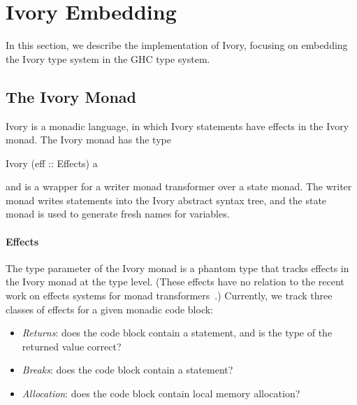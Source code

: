 \section{Ivory Embedding}
\label{sec:ivory-embedding}

In this section, we describe the implementation of Ivory, focusing on embedding
the Ivory type system in the GHC type system.

\subsection{The Ivory Monad}
\label{sec:ivory-monad}

Ivory is a monadic language, in which Ivory statements have effects in the Ivory
monad. The Ivory monad has the type

\begin{code}
Ivory (eff :: Effects) a
\end{code}

\noindent
and is a wrapper for a writer monad transformer over a state monad. The writer
monad writes statements into the Ivory abstract syntax tree, and the
state monad is used to generate fresh names for variables.

\paragraph{Effects}
The  type parameter of the Ivory monad is a phantom type that tracks
effects in the Ivory monad at the type level. (These effects have no relation to
the recent work on effects systems for monad transformers~\cite{effects}.)
Currently, we track three classes of effects for a given monadic code block:

\begin{itemize}
\item \emph{Returns}: does the code block contain a  statement, and
  is the type of the returned value correct?
\item \emph{Breaks}: does the code block contain a  statement?
\item \emph{Allocation}: does the code block contain local memory allocation?
\end{itemize}

